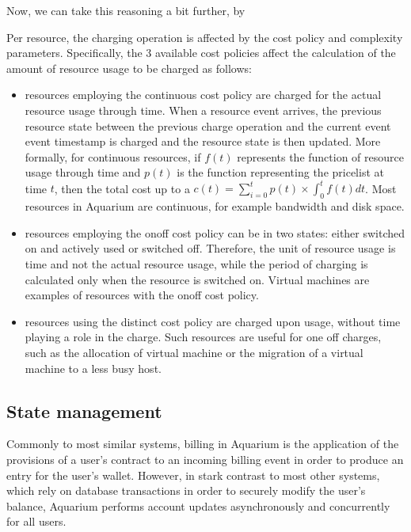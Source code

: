 \documentclass[preprint,10pt]{sigplanconf}
\begin{document}
Now, we can take this reasoning a bit further, by 

Per resource, the charging operation is affected by the cost policy and complexity
parameters. Specifically, the 3 available cost policies affect the calculation 
of the amount of resource usage to be charged as follows:

\begin{itemize}
    \item resources employing the \textsf{continuous} cost policy are charged for
        the actual resource usage through time. When a resource event arrives,
        the previous resource state between the previous charge operation and the
        current event event timestamp is charged and the resource state is then
        updated. More formally, for continuous resources, if $f(t)$ represents
        the function of resource usage through time and $p(t)$ is the function
        representing the pricelist at time $t$, 
        then the total cost up to a 
        $c(t) = \sum_{i=0}^{t} {p(t) \times \int_0^{t}{f(t)dt}}$. Most resources
        in Aquarium are continuous, for example bandwidth and disk space.

    \item resources employing the \textsf{onoff} cost policy can be in two states:
        either switched on and actively used or switched off. Therefore, the unit
        of resource usage is time and not the actual resource usage, while the
        period of charging is calculated only when the resource is switched on.
        Virtual machines are examples of resources with the \textsf{onoff} cost
        policy.

    \item resources using the \textsf{distinct} cost policy are charged
        upon usage, without time playing a role in the charge. Such resources
        are useful for one off charges, such as the allocation of
        virtual machine or the migration of a virtual machine to a less busy
        host.

\end{itemize}


\subsection{State management}
Commonly to most similar systems, billing in Aquarium is the application of the
provisions of a user's contract to an incoming billing event in order to
produce an entry for the user's wallet. However, in stark contrast to most
other systems, which rely on database transactions in order to securely modify
the user's balance, Aquarium performs account updates asynchronously and
concurrently for all users.
\end{document}
